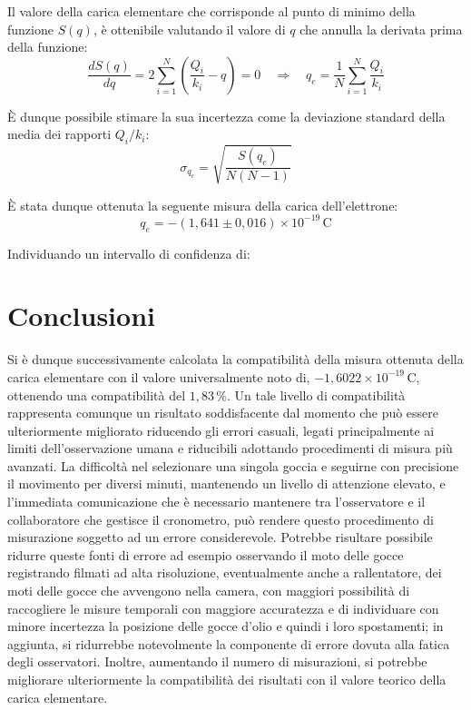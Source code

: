\documentclass[a4paper,12pt]{article}
\begin{document}
Il valore della carica elementare che corrisponde al punto di minimo della funzione \( S(q) \), è ottenibile valutando il valore di \( q \) che annulla la derivata prima della funzione:
\begin{equation}
\frac{dS(q)}{dq} = 2 \sum_{i=1}^{N} \left( \frac{Q_i}{k_i} - q \right) = 0 \quad \Rightarrow \quad q_e = \frac{1}{N}\sum_{i=1}^{N}{ \frac {Q_i} {k_i}}
\label{eq:minimizzazione_Sq}
\end{equation}

È dunque possibile stimare la sua incertezza come la deviazione standard della media dei rapporti \(Q_i/k_i\):
\begin{equation}
\sigma_{q_e} = \sqrt{\frac{S(q_e)}{N(N-1)}}
\label{eq:incertezza_qe}
\end{equation}

È stata dunque ottenuta la seguente misura della carica dell’elettrone:
\begin{equation}
q_e = - (1,641 \pm 0,016) \times 10^{-19} \, \text{C}
\label{eq:carica_elementare}
\end{equation}

Individuando un intervallo di confidenza di:
\begin{equation}
[-1,625 \times 10^{-19} \, \text{C}, \, -1,657 \times 10^{-19} \, \text{C}]
\end{equation}

\section{Conclusioni}

Si è dunque successivamente calcolata la compatibilità della misura ottenuta della carica elementare con il valore universalmente noto di, 
\( -1,6022 \times 10^{-19} \, \text{C} \), ottenendo una compatibilità del 
\( 1,83 \, \% \). 
Un tale livello di compatibilità rappresenta comunque un risultato soddisfacente dal momento che può essere ulteriormente migliorato riducendo gli errori casuali, legati principalmente ai limiti dell’osservazione umana e riducibili adottando procedimenti di misura più avanzati. La difficoltà nel selezionare una singola goccia e seguirne con precisione il movimento per diversi minuti, mantenendo un livello di attenzione elevato, e l’immediata comunicazione che è necessario mantenere tra l’osservatore e il collaboratore che gestisce il cronometro, può rendere questo procedimento di misurazione soggetto ad un errore considerevole. Potrebbe risultare possibile ridurre queste fonti di errore ad esempio osservando il moto delle gocce registrando filmati ad alta risoluzione, eventualmente anche a rallentatore, dei moti delle gocce che avvengono nella camera, con maggiori possibilità di raccogliere le misure temporali con maggiore accuratezza e di individuare con minore incertezza la posizione delle gocce d’olio e quindi i loro spostamenti; in aggiunta, si ridurrebbe notevolmente la componente di errore dovuta alla fatica degli osservatori. Inoltre, aumentando il numero di misurazioni, si potrebbe migliorare ulteriormente la compatibilità dei risultati con il valore teorico della carica elementare.
\end{document}
